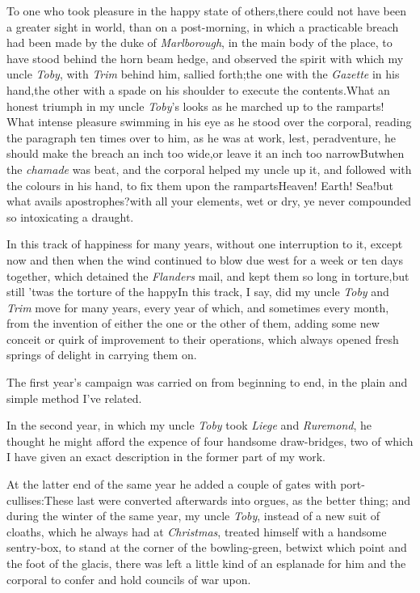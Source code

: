 \documentclass{article}
\begin{document}
To one who took pleasure in the happy state of others,\tsk there
could not have been a greater sight in world, than on a
post-morning, in which a practicable breach had been made by the
duke of \textit{Marlborough}, in the main body of the place,\tsk
to have stood behind the horn beam hedge, and observed the
spirit with which my uncle \textit{Toby}, with \textit{Trim}
behind him, sallied forth;\tsh the one with the \textit{Gazette}
in his hand,\tsk the other with a spade on his shoulder to
execute the contents.\tsh What an honest triumph in my uncle
\textit{Toby}’s looks as he marched up to the ramparts! What
intense pleasure swimming in his eye as he stood over the
corporal, reading the paragraph ten times over to him, as he was
at work, lest, peradventure, he should make the breach an inch
too wide,\tsk or leave it an inch too narrow\tsh But\break when
the \textit{chamade} was beat, and the corporal helped my uncle
up it, and followed with the colours in his hand, to fix them
upon the ramparts\tsk Heaven! Earth!  Sea!\tsh but what avails
apostrophes?\tsh with all your elements, wet or dry, ye never
compounded so intoxicating a draught.

In this track of happiness for many years, without one
interruption to it, except now and then when the wind continued to
blow due west for a week or ten days together, which detained the
\textit{Flanders} mail, and kept them so long in torture,\tsk but
still ’twas the torture of the happy\tsh In this
track, I say, did my uncle \textit{Toby} and \textit{Trim} move for
many years, every year of which, and sometimes every
month, from the invention of either the one or the other of them,
adding some new conceit or quirk of improvement to their
operations, which always opened fresh springs of delight in
carrying them on.

The first year’s campaign was carried on from beginning to
end, in the plain and simple method I’ve related.

In the second year, in which my uncle \textit{Toby} took
\textit{Liege} and \textit{Ruremond}, he thought he might afford the
expence of four handsome draw-bridges, two of which I have given
an exact description in the former part of my work.

At the latter end of the same year he added a couple of gates
with port-cullises:\tsh These last were converted
afterwards into orgues, as the better thing;
and during the winter of the same year, my uncle \textit{Toby},
instead of a new suit of cloaths, which he always had at
\textit{Christmas}, treated himself with a handsome sentry-box,
to stand at the corner of the bowling-green, betwixt which point
and the foot of the glacis, there was left a little kind of an
esplanade for him and the corporal to confer and hold councils
of war upon.
\end{document}
